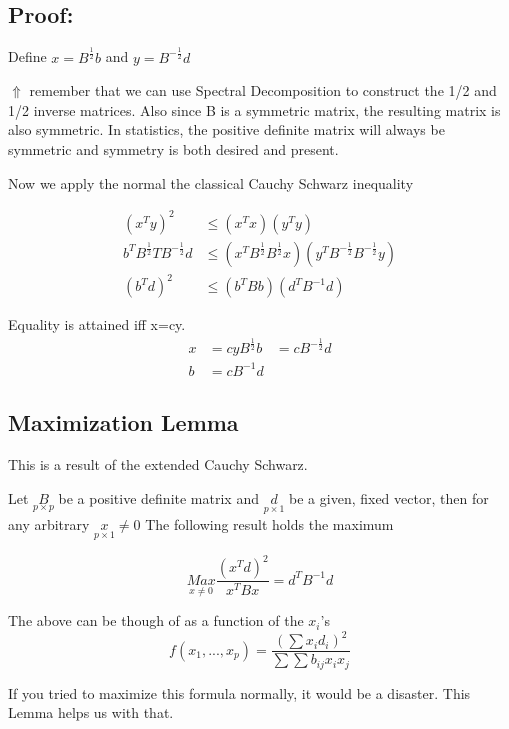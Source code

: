 \subsection{Proof:} 
Define $x=B^{\frac{1}{2}}b$ and $y= B^{-\frac{1}{2}}d$

$\Uparrow$ remember that we can use Spectral Decomposition to construct the 1/2 and 1/2 inverse matrices. Also since B is a symmetric matrix, the  resulting matrix is also symmetric. In statistics, the positive definite matrix will always be symmetric and symmetry is both desired and present.

Now we apply the normal the classical Cauchy Schwarz inequality

\begin{align*}
(x^Ty)^2 &\leq (x^Tx)(y^Ty) \\
b^TB^{\frac{1}{2}}T B^{-\frac{1}{2}}d&\leq 
(x^TB^{\frac{1}{2}}B^{\frac{1}{2}}x)(y^TB^{-\frac{1}{2}}B^{-\frac{1}{2}}y) \\
(b^Td)^2 &\leq (b^TBb)(d^TB^{-1}d)
\end{align*}

Equality is attained iff x=cy.
\begin{align*}
x &= cy
B^{\frac{1}{2}}b &= cB^{-\frac{1}{2}}d \\
b &= cB^{-1}d
\end{align*}
\subsection{Maximization Lemma}
This is a result of the extended Cauchy Schwarz.

Let $\underset{p \times p}{B}$ be a positive definite matrix and $\underset{p \times 1}{d}$ be a given, fixed vector, then for any arbitrary $\underset{p \times 1}{x}\neq 0$ The following result holds the maximum

\[\underset{x\neq 0}{Max} \frac{(x^Td)^2}{x^TBx} = d^TB^{-1}d\]

The above can be though of as a function of the $x_i$'s
\[f(x_1,...,x_p) = \frac{(\sum x_id_i)^2}{\sum\sum b_{ij}x_i x_j}\]

If you tried to maximize this formula normally, it would be a disaster. This Lemma helps us with that.